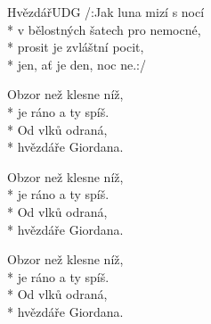\documentclass[10.5pt]{book}
\begin{document}
\begin{poem}{Hvězdář}{UDG}
/:Jak luna mizí s nocí\\*
v bělostných šatech pro nemocné,\\*
prosit je zvláštní pocit,\\*
jen, ať je den, noc ne.:/

Obzor než klesne níž, \\*
je ráno a ty spíš.\\*
Od vlků odraná, \\*
hvězdáře Giordana.

Obzor než klesne níž, \\*
je ráno a ty spíš.\\*
Od vlků odraná, \\*
hvězdáře Giordana.

Obzor než klesne níž, \\*
je ráno a ty spíš.\\*
Od vlků odraná, \\*
hvězdáře Giordana.
\end{poem}
\end{document}
